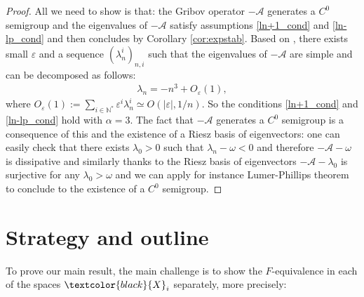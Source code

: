 \documentclass[11pt, dvipsnames]{amsart}
\begin{document}
\begin{proof}
    All we need to show is that: the Gribov operator $-\mathcal{A}$ generates a $C^0$ semigroup and the eigenvalues of $-\mathcal{A}$ satisfy assumptions \eqref{ln+1_cond} and \eqref{ln-lp_cond} and then concludes by Corollary \ref{cor:expstab}. Based on \cite[Section 4.2, Theorem 3.2]{Feki2014-riesz}, there exists small $\varepsilon$ and a sequence $(\lambda_n^i)_{n,i}$ such that the eigenvalues of $-\mathcal{A}$ are simple and can be decomposed as follows:
\begin{align*}
    \lambda_n=-n^3+O_{\varepsilon}(1),
\end{align*} where $O_{\varepsilon}(1):=\displaystyle\sum_{i\in \mathbb{N}^*}\varepsilon^i \lambda_n^i\simeq O(|\varepsilon|,1/n).$
So the conditions \eqref{ln+1_cond} and \eqref{ln-lp_cond} hold with $\alpha=3$. The fact that $-\mathcal{A}$ generates a $C^{0}$ semigroup is a consequence of this and the existence of a Riesz basis of eigenvectors: one can easily check that there exists $\lambda_{0}>0$ such that $\lambda_{n}-\omega<0$ and therefore $-\mathcal{A}-\omega$ is dissipative and similarly thanks to the Riesz basis of eigenvectors $-\mathcal{A}-\lambda_{0}$ is surjective for any $\lambda_{0}>\omega$ and we can apply for instance Lumer-Phillips theorem to conclude to the existence of a $C^{0}$ semigroup.

\end{proof}







\section{Strategy and outline}
\label{sec:strat}
To prove our main result, the main challenge is to show the $F$-equivalence in each of the spaces $\textcolor{black}{X}_{i}$ separately, more precisely:
\end{document}
